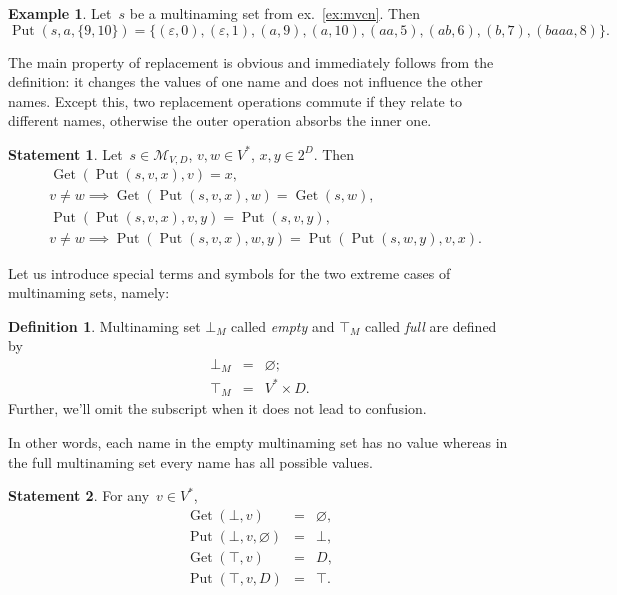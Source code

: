 \documentclass{article}
\theoremstyle{definition}
\newtheorem{Df}{Definition}
\newtheorem{St}{Statement}
\newtheorem{Ex}{Example}
\newcommand{\setcharmvcn}{M}
\newcommand{\setsymbol}[3]{\mathcal{#1}_{#2,#3}}
\newcommand{\setmvcn}[2]{\setsymbol{\setcharmvcn}{#1}{#2}}
\newcommand{\deref}{\operatorname{Get}}
\newcommand{\putval}{\operatorname{Put}}
\begin{document}
\begin{Ex}\label{ex:mvcn-replace}
Let~$s$ be a multinaming set from ex.~\ref{ex:mvcn}. Then
\[
  \putval(s, a, \{ 9, 10 \}) = \{
    (\varepsilon, 0),
    (\varepsilon, 1),
    (a,           9),
    (a,           10),
    (aa,          5),
    (ab,          6),
    (b,           7),
    (baaa,        8)
  \} .
\]
\end{Ex}

The main property of replacement is obvious and immediately follows from the
definition: it changes the values of one name and does not influence the other
names. Except this, two replacement operations commute if they
relate to different names, otherwise the outer operation absorbs the inner one.
\begin{St}\label{st:mvcn-replace-deref}
Let~$s \in \setmvcn{V}{D}$, $v, w \in V^\ast$, $x, y \in 2^D$. Then
\begin{eqnarray*}
  & \deref(\putval(s, v, x), v) = x , \\
  & v \neq w \implies \deref(\putval(s, v, x), w) = \deref(s, w) , \\
  & \putval(\putval(s, v, x), v, y) = \putval(s, v, y) , \\
  & v \neq w \implies \putval(\putval(s, v, x), w, y) = \putval(\putval(s, w, y), v, x) .
\end{eqnarray*}
\end{St}

Let us introduce special terms and symbols for the two extreme cases of
multinaming sets, namely:
\begin{Df}\label{df:mvcn-extreme}
Multinaming set $\bot_\setcharmvcn$ called \emph{empty} and $\top_\setcharmvcn$ called
\emph{full} are defined by
\begin{eqnarray*}
  \bot_\setcharmvcn &  = &  \varnothing ; \\
  \top_\setcharmvcn &  = &  V^\ast \times D .
\end{eqnarray*}
Further, we'll omit the subscript when it does not lead to confusion.
\end{Df}

In other words, each name in the empty multinaming set has no value whereas in the
full multinaming set every name has all possible values.
\begin{St}\label{st:mvcn-extreme-deref}
For any~$v\in V^\ast$,
\begin{eqnarray*}
  \deref(\bot, v) & = & \varnothing, \\
  \putval(\bot, v, \varnothing) & = & \bot , \\
  \deref(\top, v) & = & D , \\
  \putval(\top, v, D) & = & \top .
\end{eqnarray*}
\end{St}
\end{document}

